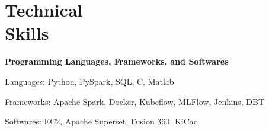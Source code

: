 \section{\mysidestyle Technical\\Skills}
\textbf{Programming Languages, Frameworks, and Softwares}
\begin{list2}
    \item{Languages: Python, PySpark, SQL, C, Matlab}
    \item{Frameworks: Apache Spark, Docker, Kubeflow, MLFlow, Jenkins, DBT}
    \item{Softwares: EC2, Apache Superset, Fusion 360, KiCad}
\end{list2}